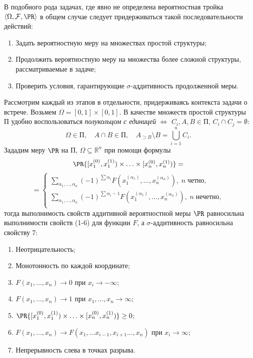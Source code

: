 \begin{remark}
В подобного рода задачах, где явно не определена вероятностная тройка $\langle \Omega, \mathcal{F}, \PR \rangle$ в общем случае следует придерживаться такой последовательности действий: 
\begin{enumerate}
\item Задать вероятностную меру на множествах простой структуры;
\item Продолжить вероятностную меру на множества более сложной структуры, рассматриваемые в задаче;  
\item Проверить условия, гарантирующие $\sigma$-аддитивность продолженной меры.   
\end{enumerate}
Рассмотрим каждый из этапов в отдельности, придерживаясь контекста задачи о встрече. Возьмем $\Omega = [0,1] \times [0,1]$. В качестве множеств простой структуры $\text{П}$ удобно воспользоваться \textit{полукольцом с единицей} $\Leftrightarrow$ $C_i, A, B \in \text{П}$, $C_i \cap C_j  = \emptyset$:
\[
\Omega \in \text{П},  \quad A\cap B \in \text{П}, \quad A_{\supset B} \setminus B = \bigcup \limits_{i=1}^n C_i.
\]
Зададим меру $\PR$ на $\text{П}$, $\Omega \subseteq \mathbb{R}^n$ при помощи формулы 
\[
\PR\{ [x_1^{(0)}, x_1^{(1)})\times \ldots \times [x_n^{(0)},  x_n^{(1)})  \} = 
\]
\[\tag{1} =
\begin{cases}
\sum \limits_{\alpha_1, \ldots, \alpha_n} (-1)^{\sum \alpha_i} F\left(x_1^{(\alpha_1)} ,\ldots, x_n^{(\alpha_n)}\right),  \; n \; \text{четно}, \\
\sum \limits_{\alpha_1, \ldots, \alpha_n} (-1)^{\sum \alpha_i - 1} F\left(x_1^{(\alpha_1)} ,\ldots, x_n^{(\alpha_n)} \right) ,  \; n \; \text{нечетно},\\
\end{cases}
\]
тогда выполнимость свойств аддитивной вероятностной меры $\PR$ равносильна  выполнимости свойств (1-6) для функции $F$, а $\sigma$-аддитивность равносильна свойству 7: 

\begin{enumerate}
\item[1.] Неотрицательность;
\item[2.] Монотонность по каждой координате;
\item[3.] $F(x_1, \ldots, x_n) \to 0$ при $x_i \to -\infty$;
\item[4.] $F(x_1, \ldots, x_n) \to 1$ при $x_1, \ldots, x_n  \to \infty$;
\item[5.] $\PR\{ [x_1^{(0)}, x_1^{(1)})\times \ldots \times [x_n^{(0)},  x_n^{(1)})  \} \geq 0$;
\item[6.] $F(x_1, \ldots, x_n) \to  F(x_1, \ldots x_{i-1}, x_{i+1}  \ldots , x_n)$ при $x_i \to \infty$;
\item[7.] Непрерывность слева в точках разрыва.
\end{enumerate} 


\end{remark}
